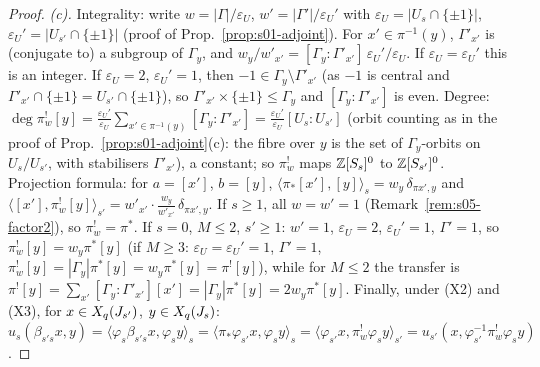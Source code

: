 \begin{proof}
\emph{(c).} Integrality: write $w=|\Gamma|/\varepsilon_U$, $w'=|\Gamma'|/\varepsilon_U'$ with $\varepsilon_U=|U_s\cap\{\pm1\}|$, $\varepsilon_U'=|U_{s'}\cap\{\pm1\}|$
(proof of Prop.~\ref{prop:s01-adjoint}). For $x'\in\pi^{-1}(y)$, $\Gamma'_{x'}$ is (conjugate to) a subgroup of $\Gamma_y$, and
$w_y/w'_{x'}=[\Gamma_y:\Gamma'_{x'}]\,\varepsilon_U'/\varepsilon_U$. If $\varepsilon_U=\varepsilon_U'$ this is an integer. If $\varepsilon_U=2$, $\varepsilon_U'=1$, then
$-1\in\Gamma_y\setminus\Gamma'_{x'}$ (as $-1$ is central and $\Gamma'_{x'}\cap\{\pm1\}=U_{s'}\cap\{\pm1\}$), so $\Gamma'_{x'}\times\{\pm1\}\le\Gamma_y$ and
$[\Gamma_y:\Gamma'_{x'}]$ is even. Degree: $\deg\pi^!_w[y]=\frac{\varepsilon_U'}{\varepsilon_U}\sum_{x'\in\pi^{-1}(y)}[\Gamma_y:\Gamma'_{x'}]=\frac{\varepsilon_U'}{\varepsilon_U}[U_s:U_{s'}]$
(orbit counting as in the proof of Prop.~\ref{prop:s01-adjoint}(c): the fibre over $y$ is the set of $\Gamma_y$-orbits on $U_s/U_{s'}$, with
stabilisers $\Gamma'_{x'}$), a constant; so $\pi^!_w$ maps $\mathbb{Z}[S_s]^0$ to $\mathbb{Z}[S_{s'}]^0$. Projection formula: for $a=[x']$, $b=[y]$,
$\langle\pi_*[x'],[y]\rangle_s=w_y\,\delta_{\pi x',y}$ and $\langle[x'],\pi^!_w[y]\rangle_{s'}=w'_{x'}\cdot\frac{w_y}{w'_{x'}}\,\delta_{\pi x',y}$. If $s\ge1$,
all $w=w'=1$ (Remark~\ref{rem:s05-factor2}), so $\pi^!_w=\pi^*$. If $s=0$, $M\le2$, $s'\ge1$: $w'=1$, $\varepsilon_U=2$, $\varepsilon_U'=1$, $\Gamma'=1$,
so $\pi^!_w[y]=w_y\pi^*[y]$ (if $M\ge3$: $\varepsilon_U=\varepsilon_U'=1$, $\Gamma'=1$, $\pi^!_w[y]=|\Gamma_y|\pi^*[y]=w_y\pi^*[y]=\pi^![y]$), while for $M\le2$ the transfer is $\pi^![y]=\sum_{x'}[\Gamma_y:\Gamma'_{x'}][x']=|\Gamma_y|\pi^*[y]=2w_y\pi^*[y]$. Finally, under
(X2) and (X3), for $x\in X_q(J_{s'})$, $y\in X_q(J_s)$:
$u_s(\beta_{s's}x,y)=\langle\varphi_s\beta_{s's}x,\varphi_sy\rangle_s=\langle\pi_*\varphi_{s'}x,\varphi_sy\rangle_s=\langle\varphi_{s'}x,\pi^!_w\varphi_sy\rangle_{s'}
=u_{s'}(x,\varphi_{s'}^{-1}\pi^!_w\varphi_sy)$.


\end{proof}
